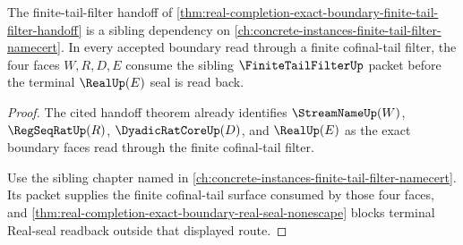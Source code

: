 \begin{theorem}
\label{thm:real-completion-exact-boundary-filter-handoff-sibling-link}
The finite-tail-filter handoff of \autoref{thm:real-completion-exact-boundary-finite-tail-filter-handoff} is a sibling dependency on \autoref{ch:concrete-instances-finite-tail-filter-namecert}. In every accepted boundary read through a finite cofinal-tail filter, the four faces $W,R,D,E$ consume the sibling $\FiniteTailFilterUp$ packet before the terminal $\RealUp(E)$ seal is read back.
\end{theorem}
\begin{proof}
The cited handoff theorem already identifies $\StreamNameUp(W)$, $\RegSeqRatUp(R)$, $\DyadicRatCoreUp(D)$, and $\RealUp(E)$ as the exact boundary faces read through the finite cofinal-tail filter.

Use the sibling chapter named in \autoref{ch:concrete-instances-finite-tail-filter-namecert}. Its packet supplies the finite cofinal-tail surface consumed by those four faces, and \autoref{thm:real-completion-exact-boundary-real-seal-nonescape} blocks terminal Real-seal readback outside that displayed route.
\end{proof}

